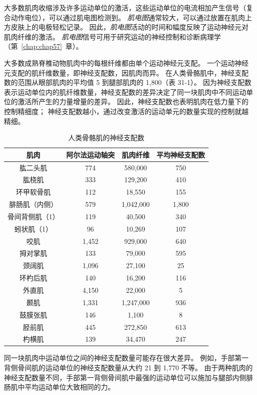 大多数肌肉收缩涉及许多运动单位的激活，这些运动单位的电流相加产生信号（复合动作电位），可以通过肌电图检测到。
\textit{肌电图}通常较大，可以通过放置在肌肉上方皮肤上的电极轻松记录。
因此，\textit{肌电图}活动的时间和幅度反映了运动神经元对肌肉纤维的激活。
\textit{肌电图}信号可用于研究运动的神经控制和诊断病理学（第~\ref{chap:chap57}~章）。


大多数成熟脊椎动物肌肉中的每根纤维都由单个运动神经元支配。
一个运动神经元支配的肌纤维数量，即神经支配数，因肌肉而异。
在人类骨骼肌中，神经支配数的范围从眼部肌肉的平均值 5 到腿部肌肉的 1,800（表 31-1）。
因为神经支配数表示运动单位内的肌纤维数量，神经支配数的差异决定了同一块肌肉中不同运动单位的激活所产生的力量增量的差异。
因此，神经支配数也表明肌肉在低力量下的控制精细度； 神经支配数越小，通过改变激活的运动单元的数量实现的控制就越精细。


\begin{table}[htbp]
	\caption{人类骨骼肌的神经支配数\label{tab:31_1}}
	\centering
	\begin{tabular}{cccc}
		\toprule
		肌肉 & 阿尔法运动轴突 & 肌肉纤维 & 平均神经支配数\\
		\midrule
		肱二头肌 & 774  & 580,000 & 750 \\
		肱桡肌 & 333  & 129,200 & 410 \\
		环甲软骨肌 & 112  & 18,550 & 155 \\
		腓肠肌（内侧） & 579  & 1,042,000 & 1,800 \\
		骨间背侧肌（1） & 119  & 40,500 & 340 \\
		蚓状肌（1） & 96  & 10,269 & 107 \\
		咬肌 & 1,452  & 929,000 & 640 \\
		拇对掌肌 & 133  & 79,000 & 595 \\
		颈阔肌 & 1,096  & 27,100 & 25 \\
		环杓后肌 & 140  & 16,200 & 116 \\
		外直肌 & 4,150  & 22,000 & 5 \\
		颞肌 & 1,331  & 1,247,000 & 936 \\
		鼓膜张肌 & 146  & 1,100 & 8 \\
		胫前肌 & 445  & 272,850 & 613 \\
		杓横肌 & 139  & 34,470 & 247 \\
		\bottomrule
	\end{tabular}
\end{table}


同一块肌肉中运动单位之间的神经支配数量可能存在很大差异。
例如，手部第一背侧骨间肌的运动单位的神经支配数量从大约 21 到 1,770 不等。
由于两种肌肉的神经支配数量不同，手部第一背侧骨间肌中最强的运动单位可以施加与腿部内侧腓肠肌中平均运动单位大致相同的力。


